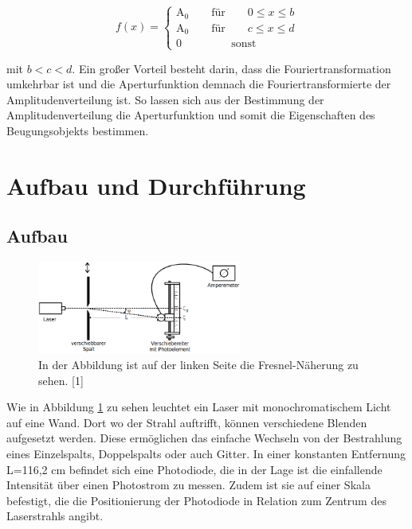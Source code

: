 \documentclass[titlepage = firstcover]{scrartcl}
\begin{document}
                    \begin{equation*}
                        f(x) =  \begin{cases}
                            \text{A}_0 \qquad \text{für} \qquad 0 \leqslant x \leqslant b \\
                            \text{A}_0 \qquad \text{für} \qquad c \leqslant x \leqslant d \\
                            0 \qquad \qquad \: \: \text{sonst}
                        \end{cases}
                    \end{equation*}

                    \noindent
                    mit $ b < c < d$. Ein großer Vorteil besteht darin, dass die Fouriertransformation umkehrbar ist und die Aperturfunktion demnach die Fouriertransformierte der Amplitudenverteilung
                    ist. So lassen sich aus der Bestimmung der Amplitudenverteilung die Aperturfunktion und somit die Eigenschaften des Beugungsobjekts bestimmen.

    

    \section{Aufbau und Durchführung}
        \subsection{Aufbau}
            \FloatBarrier

            \begin{figure}[h]
              \centering
              \includegraphics[width = 0.6\textwidth]{Bilder/Aufbau.png}
              \caption{In der Abbildung ist auf der linken Seite die Fresnel-Näherung zu sehen. [1]}
              \label{fig:Aufbau}
            \end{figure}
        
            \FloatBarrier
        
            \noindent

            Wie in Abbildung \ref{fig:Aufbau} zu sehen leuchtet ein Laser mit monochromatischem Licht auf eine Wand. Dort wo der Strahl auftrifft, können verschiedene Blenden aufgesetzt werden. Diese
            ermöglichen das einfache Wechseln von der Bestrahlung eines Einzelspalts, Doppelspalts oder auch Gitter. In einer konstanten Entfernung L=116,2 cm befindet sich eine Photodiode, die in der Lage
            ist die einfallende Intensität über einen Photostrom zu messen. Zudem ist sie auf einer Skala befestigt, die die Positionierung der Photodiode in Relation zum Zentrum des Laserstrahls
            angibt.
            
\end{document}
